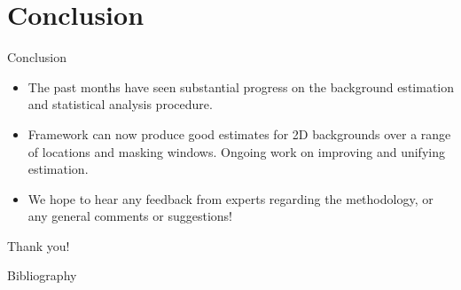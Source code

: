 \documentclass[10pt]{beamer}
\newif\iflong
\begin{document}
%   
%   


\section{Conclusion}
\label{sec:conclusion}


\begin{frame}{Conclusion}
  \begin{itemize}
  \item The past months have seen substantial progress on the background estimation and statistical analysis procedure.
  \item Framework can now produce good estimates for 2D backgrounds over a range of locations and masking windows. Ongoing work on improving and unifying estimation. 
    \iflong \item We hope to present on further topics in the coming weeks/months, including trigger studies and data/mc comparisons for Run2 and Run3, and out finalized statitiscal procedure. \fi
  \item We hope to hear any feedback from experts regarding the methodology, or any general comments or suggestions!
  \end{itemize}
  \vspace{1cm}

  \begin{center}
    {\Large Thank you!}
  \end{center}
\end{frame}

\begin{frame}[allowframebreaks]{Bibliography}
  
  
\end{frame}


\appendix
\end{document}
